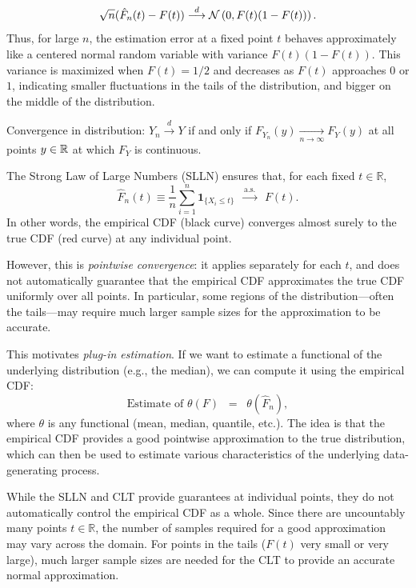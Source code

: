 \[
    \sqrt{n} (\hat{F}_{n}(t) - F(t)) \overset{d}{\longrightarrow} \mathcal{N}\left(0,F(t)(1-F(t))\right).
\]
Thus, for large \(n\), the estimation error at a fixed point \(t\) behaves approximately like a centered normal random variable with variance \(F(t)(1-F(t))\). This variance is maximized when \(F(t)=1/2\) and decreases as \(F(t)\) approaches \(0\) or \(1\), indicating smaller fluctuations in the tails of the distribution, and bigger on the middle of the distribution. 

\begin{note}[]
    Convergence in distribution: \(Y_{n} \overset{d}{\longrightarrow}Y\) if and only if \(F_{Y_{n}}(y) \underset{n \to \infty}{\longrightarrow}F_{Y}(y)\) at all points \(y \in \mathbb{R}\) at which \(F_{Y}\) is continuous.
\end{note}

The Strong Law of Large Numbers (SLLN) ensures that, for each fixed \(t \in \mathbb{R}\),
\[
\hat F_n(t) \equiv \frac{1}{n} \sum_{i=1}^n \mathbf{1}_{\{X_i \le t\}} \;\;\overset{\text{a.s.}}{\longrightarrow}\;\; F(t).
\]
In other words, the empirical CDF (black curve) converges almost surely to the true CDF (red curve) at any individual point.  

However, this is \emph{pointwise convergence}: it applies separately for each \(t\), and does not automatically guarantee that the empirical CDF approximates the true CDF uniformly over all points. In particular, some regions of the distribution—often the tails—may require much larger sample sizes for the approximation to be accurate.  

This motivates \emph{plug-in estimation}. If we want to estimate a functional of the underlying distribution (e.g., the median), we can compute it using the empirical CDF:
\[
\text{Estimate of } \theta(F) \;\;=\;\; \theta(\hat F_n),
\]
where \(\theta\) is any functional (mean, median, quantile, etc.). The idea is that the empirical CDF provides a good pointwise approximation to the true distribution, which can then be used to estimate various characteristics of the underlying data-generating process.

While the SLLN and CLT provide guarantees at individual points, they do not automatically control the empirical CDF as a whole. Since there are uncountably many points \(t \in \mathbb{R}\), the number of samples required for a good approximation may vary across the domain. For points in the tails (\(F(t)\) very small or very large), much larger sample sizes are needed for the CLT to provide an accurate normal approximation.

